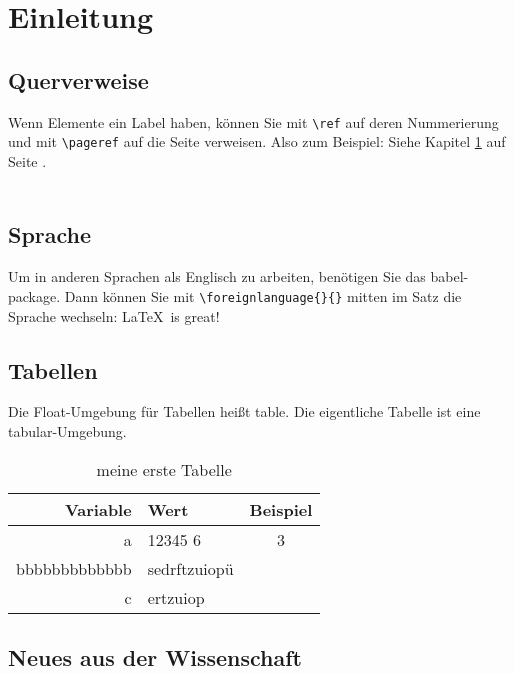  \chapter{Einleitung}\label{chapterIntroduction}

\section{Querverweise}

Wenn Elemente ein Label haben, können Sie mit \verb|\ref| auf deren Nummerierung und mit \verb|\pageref| auf die Seite verweisen. Also zum Beispiel: Siehe Kapitel \ref{chapterIntroduction} auf Seite \pageref{chapterIntroduction}.\\
\ \\

\section{Sprache}

Um in anderen Sprachen als Englisch zu arbeiten, benötigen Sie das babel-package. Dann können Sie mit \verb|\foreignlanguage{}{}| mitten im Satz die Sprache wechseln:  \foreignlanguage{english}{\LaTeX\ is great!}

\section{Tabellen}

Die Float-Umgebung für Tabellen heißt table. Die eigentliche Tabelle ist eine tabular-Umgebung.

\begin{table}
\begin{center}
\begin{tabular}{rlc} %
\toprule %
Variable & Wert & Beispiel\\
\midrule %
a & 12345 6 & 3 \\
bbbbbbbbbbbbb & sedrftzuiopü\\
c & ertzuiop\\
\bottomrule
\end{tabular}
\label{tabMeine}
\caption{meine erste Tabelle}
\end{center}
\end{table}


\section{Neues aus der Wissenschaft}

